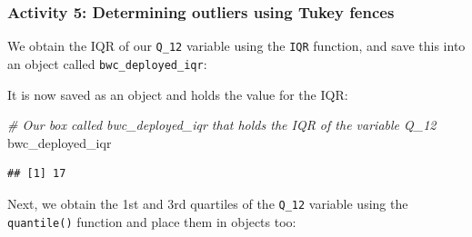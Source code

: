\documentclass[
]{book}
\newenvironment{Shaded}{\begin{snugshade}}{\end{snugshade}}
\newcommand{\AttributeTok}[1]{\textcolor[rgb]{0.77,0.63,0.00}{#1}}
\newcommand{\CommentTok}[1]{\textcolor[rgb]{0.56,0.35,0.01}{\textit{#1}}}
\newcommand{\ConstantTok}[1]{\textcolor[rgb]{0.00,0.00,0.00}{#1}}
\newcommand{\FloatTok}[1]{\textcolor[rgb]{0.00,0.00,0.81}{#1}}
\newcommand{\FunctionTok}[1]{\textcolor[rgb]{0.00,0.00,0.00}{#1}}
\newcommand{\NormalTok}[1]{#1}
\newcommand{\OtherTok}[1]{\textcolor[rgb]{0.56,0.35,0.01}{#1}}
\newcommand{\SpecialCharTok}[1]{\textcolor[rgb]{0.00,0.00,0.00}{#1}}
\begin{document}
\hypertarget{activity-5-determining-outliers-using-tukey-fences}{%
\subsubsection{Activity 5: Determining outliers using Tukey fences}\label{activity-5-determining-outliers-using-tukey-fences}}

We obtain the IQR of our \texttt{Q\_12} variable using the \texttt{IQR} function, and save this into an object called \texttt{bwc\_deployed\_iqr}:

\begin{Shaded}
\end{Shaded}

It is now saved as an object and holds the value for the IQR:

\begin{Shaded}
\begin{Highlighting}[]
\CommentTok{\# Our \textquotesingle{}box\textquotesingle{} called \textquotesingle{}bwc\_deployed\_iqr\textquotesingle{} that holds the IQR of the variable Q\_12}
\NormalTok{bwc\_deployed\_iqr}
\end{Highlighting}
\end{Shaded}

\begin{verbatim}
## [1] 17
\end{verbatim}

Next, we obtain the 1st and 3rd quartiles of the \texttt{Q\_12} variable using the \texttt{quantile()} function and place them in objects too:

\begin{Shaded}
\end{Shaded}
\end{document}
